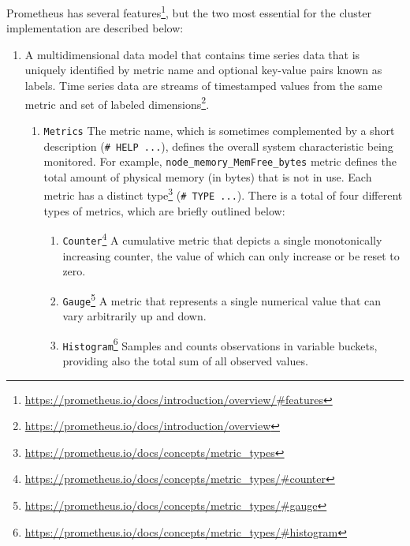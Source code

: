 Prometheus has several features\footnote{\url{https://prometheus.io/docs/introduction/overview/\#features}},
but the two most essential for the cluster implementation are described below:
\begin{enumerate}
  \item A multidimensional data model that contains time series data that is uniquely
    identified by metric name and optional key-value pairs known as labels. Time
    series data are streams of timestamped values from the same metric and set
    of labeled dimensions\footnote{\url{https://prometheus.io/docs/introduction/overview}}.
    \begin{enumerate}
      \item \texttt{Metrics}
        \newline
        The metric name, which is sometimes complemented by a short description (\lstinline[language=prometheus]{# HELP ...}),
        defines the overall system characteristic being monitored.
        \newline
        For example, \lstinline[language=prometheus, alsoletter={_},
        morekeywords={node_memory_MemFree_bytes}]{node_memory_MemFree_bytes}
        metric defines the total amount of physical memory (in bytes) that is
        not in use.
        \newline
        Each metric has a distinct type\footnote{\url{https://prometheus.io/docs/concepts/metric_types}}
        (\lstinline[language=prometheus]{# TYPE ...}). There is a total of four
        different types of metrics, which are briefly outlined below:
        \begin{enumerate}
          \item \texttt{Counter}\footnote{\url{https://prometheus.io/docs/concepts/metric_types/\#counter}}
            \newline
            A cumulative metric that depicts a single monotonically increasing
            counter, the value of which can only increase or be reset to zero.

          \item \texttt{Gauge}\footnote{\url{https://prometheus.io/docs/concepts/metric_types/\#gauge}}
            \newline
            A metric that represents a single numerical value that can vary
            arbitrarily up and down.

          \item \texttt{Histogram}\footnote{\url{https://prometheus.io/docs/concepts/metric_types/\#histogram}}
            \newline
            Samples and counts observations in variable buckets, providing also the
            total sum of all observed values.


\end{enumerate}
\end{enumerate}
\end{enumerate}
